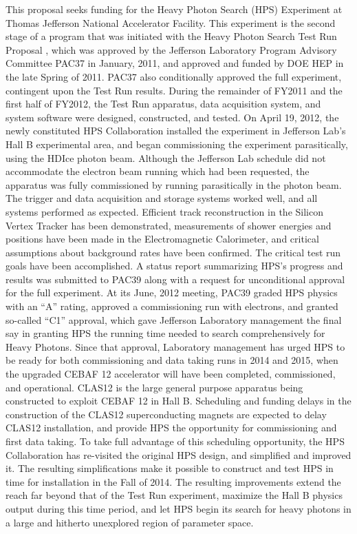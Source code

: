 This proposal seeks funding for the Heavy Photon Search (HPS) Experiment at Thomas Jefferson National Accelerator Facility.  This experiment  is the second stage of a program that was initiated with the Heavy Photon Search Test Run Proposal \cite{HPS_PROP, HPS_tPROP}, which was approved by the Jefferson Laboratory Program Advisory Committee PAC37 in January, 2011, and approved and funded by DOE HEP in the late Spring of 2011. PAC37 also conditionally approved the full experiment, contingent upon the Test Run results.  During the remainder of FY2011 and the first half of FY2012, the Test Run apparatus, data acquisition system, and system software were designed, constructed, and tested. On April 19, 2012, the newly constituted HPS Collaboration installed the experiment in Jefferson Lab's Hall B experimental area, and began commissioning the experiment parasitically, using the HDIce photon beam. Although the Jefferson Lab schedule did not accommodate the electron beam running which had been requested, the apparatus was fully commissioned by running parasitically in the photon beam. The trigger and data acquisition and storage systems worked well, and all systems performed as expected. Efficient track reconstruction in the Silicon Vertex Tracker has been demonstrated, measurements of shower energies and positions have been made in the Electromagnetic Calorimeter, and critical assumptions about background rates have been confirmed. The critical test run goals have been accomplished.  A status report summarizing HPS's progress and results was submitted to PAC39 \cite{HPS_PROP_UPD} along with a request for unconditional approval for the full experiment. At its June, 2012  meeting,  PAC39 graded HPS physics with an ``A'' rating, approved a commissioning run with electrons, and granted so-called ``C1'' approval, which gave Jefferson Laboratory management the final say in granting HPS the running time needed to search comprehensively for Heavy Photons. Since that approval, Laboratory management has urged HPS to be ready for both  commissioning and data taking runs in 2014 and 2015, when the upgraded CEBAF 12 accelerator will have been completed, commissioned, and operational. CLAS12 is the large general purpose apparatus being constructed to exploit CEBAF 12 in Hall B. Scheduling and funding delays in the construction of the CLAS12 superconducting magnets are expected  to delay CLAS12 installation, and provide HPS the opportunity for commissioning and first data taking. To take full advantage of this  scheduling opportunity, the HPS Collaboration has re-visited the original HPS design, and simplified and improved it. The resulting simplifications make it possible to construct and test HPS in time for installation in the Fall of 2014. The resulting improvements extend the reach far beyond that of the Test Run experiment, maximize the Hall B physics output during this time period, and let HPS begin its search for heavy photons in a large and hitherto unexplored region of parameter space.  

